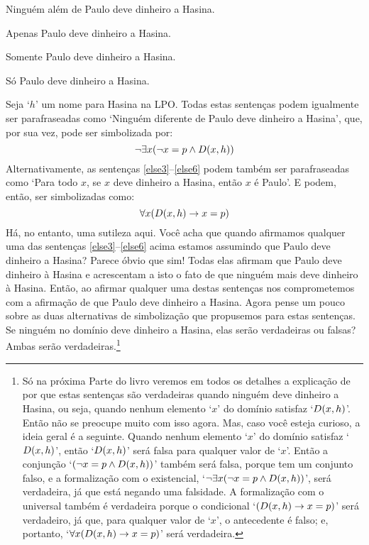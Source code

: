 \begin{earg}
\item[\ex{else3}] Ninguém além de Paulo deve dinheiro a Hasina.
\item[\ex{else4}] Apenas Paulo deve dinheiro a Hasina.
\item[\ex{else5}] Somente Paulo deve dinheiro a Hasina.
\item[\ex{else6}] Só Paulo deve dinheiro a Hasina.
\end{earg}
Seja `$h$' um nome para Hasina na LPO.
Todas estas sentenças podem igualmente ser parafraseadas como
`Ninguém diferente de Paulo deve dinheiro a Hasina', que, por sua vez, pode ser simbolizada por:
$$\neg\exists x(\neg x = p \wedge \mathord{D}(x,h))$$
Alternativamente, as sentenças \ref{else3}--\ref{else6} podem também ser parafraseadas como
`Para todo $x$, se $x$ deve dinheiro a Hasina, então $x$ é Paulo'.
E podem, então, ser simbolizadas como:
$$\forall x (\mathord{D}(x,h) \rightarrow x = p)$$
Há, no entanto, uma sutileza aqui.
Você acha que quando afirmamos qualquer uma das sentenças \ref{else3}--\ref{else6} acima estamos assumindo que Paulo deve dinheiro a Hasina?
Parece óbvio que sim!
Todas elas afirmam que Paulo deve dinheiro à Hasina e acrescentam a isto o fato de que ninguém mais deve dinheiro à Hasina.
Então, ao afirmar qualquer uma destas sentenças nos comprometemos com a afirmação de que Paulo deve dinheiro a Hasina.
Agora pense um pouco sobre as duas alternativas de simbolização que propusemos para estas sentenças.
Se ninguém no domínio deve dinheiro a Hasina, elas serão verdadeiras ou falsas?
Ambas serão verdadeiras.\footnote{
	Só na próxima Parte do livro veremos em todos os detalhes a explicação de por que estas sentenças são verdadeiras quando ninguém deve dinheiro a Hasina, ou seja, quando nenhum elemento `$x$' do domínio satisfaz `$\mathord{D}(x,h)$'.
	Então não se preocupe muito com isso agora.
	Mas, caso você esteja curioso, a ideia geral é a seguinte.
	Quando nenhum elemento `$x$' do domínio satisfaz `$\mathord{D}(x,h)$', então `$\mathord{D}(x,h)$' será falsa para qualquer valor de `$x$'.
	Então a conjunção `$(\neg x = p \wedge \mathord{D}(x,h))$' também será falsa, porque tem um conjunto falso, e a formalização com o existencial, `$\neg\exists x(\neg x = p \wedge \mathord{D}(x,h))$', será verdadeira, já que está negando uma falsidade.
	A formalização com o universal também é verdadeira porque o condicional `$(\mathord{D}(x,h) \rightarrow x = p)$' será verdadeiro, já que, para qualquer valor de `$x$', o antecedente é falso;  e, portanto, `$\forall x (\mathord{D}(x,h) \rightarrow x = p)$' será verdadeira.}	
